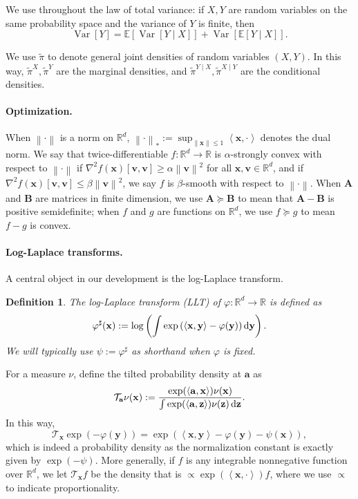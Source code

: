 \documentclass[11pt]{article}
\newtheorem{definition}{Definition}
\newcommand{\defeq}{:=}
\newcommand{\norm}[1]{\left\lVert#1\right\rVert}
\newcommand{\inprod}[2]{\left\langle#1, #2\right\rangle}
\newcommand{\R}{\mathbb{R}}
\newcommand{\dd}{\textup{d}}
\newcommand{\Par}[1]{\left(#1\right)}
\newcommand{\ma}{\mathbf{A}}
\newcommand{\mb}{\mathbf{B}}
\newcommand{\0}{\mathbf{0}}
\newcommand{\1}{\mathbf{1}}
\newcommand{\va}{\mathbf{a}}
\newcommand{\vv}{\mathbf{v}}
\newcommand{\vx}{\mathbf{x}}
\newcommand{\vy}{\mathbf{y}}
\newcommand{\vz}{\mathbf{z}}
\newcommand{\tilt}{\mathcal{T}}
\newcommand{\vhi}{\varphi}
\newcommand{\tpi}{\tilde{\pi}}
\begin{document}
We use throughout the law of total variance: if $X, Y$ are random variables on the same probability space and the variance of $Y$ is finite, then
\begin{equation}\label{eq:total-var}
    \operatorname{Var}[Y]=\mathbb{E}[\operatorname{Var}[Y\mid X]]+\operatorname{Var}[\mathbb{E}[Y\mid X]].
\end{equation}


We use $\tilde{\pi}$ to denote general joint densities of random variables $(X, Y)$.  In this way, $\tilde{\pi}^X, \tpi^Y$ are the marginal densities, and $\tpi^{Y\mid X}, \tpi^{X\mid Y}$ are the conditional densities.

\paragraph{Optimization.} When $\norm{\cdot}$ is a norm on $\R^d$, $\norm{\cdot}_* \defeq \sup_{\norm{\vx}\le 1} \inprod{\vx}{\cdot}$ denotes the dual norm. We say that twice-differentiable $f: \R^d \to \R$ is $\alpha$-strongly convex with respect to $\norm{\cdot}$ if $\nabla^2 f(\vx)[\vv, \vv] \ge \alpha \norm{\vv}^2$ for all $\vx, \vv \in \R^d$, and if $\nabla^2 f(\vx)[\vv, \vv] \le \beta \norm{\vv}^2$, we say $f$ is $\beta$-smooth with respect to $\norm{\cdot}$. When $\ma$ and $\mb$ are matrices in finite dimension, we use $\ma \succeq \mb$ to mean that $\ma - \mb$ is positive semidefinite; when $f$ and $g$ are functions on $\R^d$, we use $f \succeq g$ to mean $f - g$ is convex.

\paragraph{Log-Laplace transforms.} A central object in our development is the log-Laplace transform.

\begin{definition}\label{def:llt}
    The \emph{log-Laplace transform (LLT)} of $\varphi:\R^d\to \R$ is defined as \[
    \varphi^\sharp(\vx) \defeq \log\Par{\int \exp\Par{\inprod{\vx}{\vy}-\varphi(\vy)}\dd \vy}.
    \]
We will typically use $\psi \defeq \vhi^\sharp$ as shorthand when $\varphi$ is fixed.
\end{definition}


For a measure $\nu$, define the tilted probability density at $\va$ as
\begin{equation}
        \mathcal{T}_\va \nu(\vx)\defeq \frac{\exp(\inprod{\va}{\vx}) \nu(\vx)}{\int \exp(\inprod{\va}{\vz}) \nu(\vz)\,\dd\vz}.
\end{equation}
In this way, \begin{equation}
    \tilt_\vx\exp(-\vhi(\vy)) = \exp\Par{\inprod{\vx}{\vy}-\varphi(\vy)-\psi(\vx)},
\end{equation}
which is indeed a probability density as the normalization constant is exactly given by $\exp(-\psi)$. More generally, if $f$ is any integrable nonnegative function over $\R^d$, we let $\tilt_{\vx} f$ be the density that is $\propto \exp(\inprod{\vx}{\cdot}) f$, where we use $\propto$ to indicate proportionality.
\end{document}
